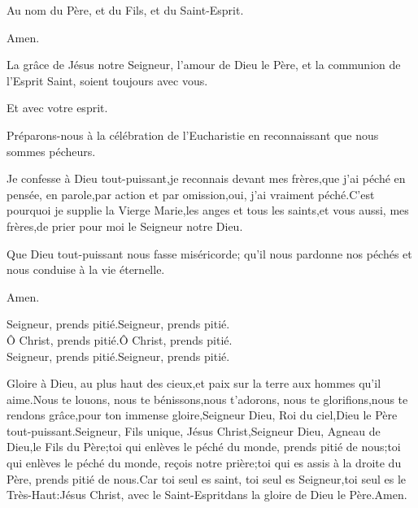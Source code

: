 \indent \pr Au nom du Père, et du Fils, et du Saint-Esprit.

\be Amen.

\pr La grâce de Jésus notre Seigneur, l'amour de Dieu le Père, et la communion de l'Esprit Saint, soient toujours avec vous.

\be Et avec votre esprit.

\pr Préparons-nous à la célébration de l'Eucharistie en reconnaissant que nous sommes pécheurs.

\be Je confesse à Dieu tout-puissant,\redast je reconnais devant mes frères,\redast que j'ai péché en pensée, en parole,\redast par action et par omission,\redast oui, j'ai vraiment péché.\redast C'est pourquoi je supplie la Vierge Marie,\redast les anges et tous les saints,\redast et vous aussi, mes frères,\redast de prier pour moi le Seigneur notre Dieu.

\pr Que Dieu tout-puissant nous fasse miséricorde; qu'il nous pardonne nos péchés et nous conduise à la vie éternelle.

\be Amen.

\pr Seigneur, prends pitié.\redast\be Seigneur, prends pitié.\\
\indent\pr Ô Christ, prends pitié.\redast\be Ô Christ, prends pitié.\\
\indent\pr Seigneur, prends pitié.\redast\be Seigneur, prends pitié.

\be Gloire à Dieu, au plus haut des cieux,\redast et paix sur la terre aux hommes qu'il aime.\redast Nous te louons, nous te bénissons,\redast nous t’adorons, nous te glorifions,\redast nous te rendons grâce,\redast pour ton immense gloire,\redast Seigneur Dieu, Roi du ciel,\redast Dieu le Père tout-puissant.\redast Seigneur, Fils unique, Jésus Christ,\redast Seigneur Dieu, Agneau de Dieu,\redast le Fils du Père;\redast toi qui enlèves le péché du monde, prends pitié de nous;\redast toi qui enlèves le péché du monde, reçois notre prière;\redast toi qui es assis à la droite du Père, prends pitié de nous.\redast Car toi seul es saint, toi seul es Seigneur,\redast toi seul es le Très-Haut:\redast Jésus Christ, avec le Saint-Esprit\redast dans la gloire de Dieu le Père.\redast Amen.

\newpage 